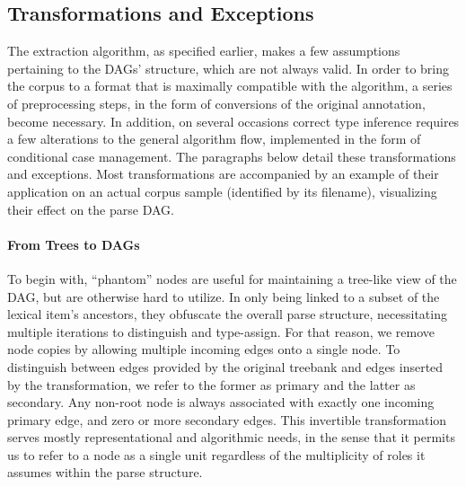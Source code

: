 \subsection{Transformations and Exceptions}
\label{subsec:transformations}

The extraction algorithm, as specified earlier, makes a few assumptions pertaining to the DAGs' structure, which are not always valid.
In order to bring the corpus to a format that is maximally compatible with the algorithm, a series of preprocessing steps, in the form of conversions of the original annotation, become necessary.
In addition, on several occasions correct type inference requires a few alterations to the general algorithm flow, implemented in the form of conditional case management.
The paragraphs below detail these transformations and exceptions.
Most transformations are accompanied by an example of their application on an actual corpus sample (identified by its filename), visualizing their effect on the parse DAG.

\paragraph{From Trees to DAGs}
To begin with, ``phantom'' nodes are useful for maintaining a tree-like view of the DAG, but are otherwise hard to utilize.
In only being linked to a subset of the lexical item's ancestors, they obfuscate the overall parse structure, necessitating multiple iterations to distinguish and type-assign.
For that reason, we remove node copies by allowing multiple incoming edges onto a single node.
To distinguish between edges provided by the original treebank and edges inserted by the transformation, we refer to the former as primary and the latter as secondary.
Any non-root node is always associated with exactly one incoming primary edge, and zero or more secondary edges.
This invertible transformation serves mostly representational and algorithmic needs, in the sense that it permits us to refer to a node as a single unit regardless of the multiplicity of roles it assumes within the parse structure. 

